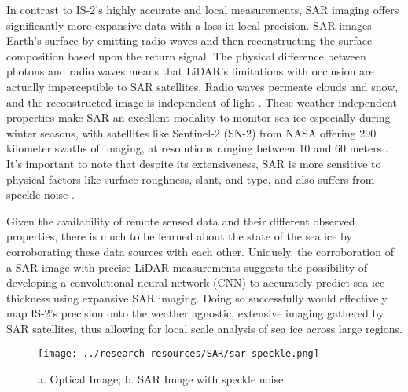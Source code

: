 In contrast to IS-2's highly accurate and local measurements, SAR imaging offers significantly more expansive data with a loss in local precision. SAR images Earth's surface by emitting radio waves and then reconstructing the surface composition based upon the return signal. The physical difference between photons and radio waves means that LiDAR's limitations with occlusion are actually imperceptible to SAR satellites. Radio waves permeate clouds and snow, and the reconstructed image is independent of light \cite{SAR-Info}. These weather independent properties make SAR an excellent modality to monitor sea ice especially during winter seasons, with satellites like Sentinel-2 (SN-2) from NASA offering 290 kilometer swaths of imaging, at resolutions ranging between 10 and 60 meters \cite{Sentinel-2-Availability}. It's important to note that despite its extensiveness, SAR is more sensitive to physical factors like surface roughness, slant, and type, and also suffers from speckle noise \cite{SAR-Info}. 

\indent Given the availability of remote sensed data and their different observed properties, there is much to be learned about the state of the sea ice by corroborating these data sources with each other. Uniquely, the corroboration of a SAR image with precise LiDAR measurements suggests the possibility of developing a convolutional neural network (CNN) to accurately predict sea ice thickness using expansive SAR imaging. Doing so successfully would effectively map IS-2's precision onto the weather agnostic, extensive imaging gathered by SAR satellites, thus allowing for local scale analysis of sea ice across large regions.

\begin{figure}
	\hfill\begin{minipage}{.5\textwidth}\centering
	 \texttt{[image: ../research-resources/SAR/sar-speckle.png]}
	 \caption{a. Optical Image; b. SAR Image with speckle noise}
	\end{minipage}
 \end{figure}


